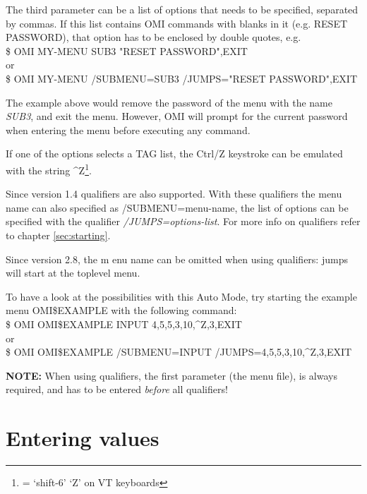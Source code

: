 \documentclass[a4paper]{book}
\newcommand{\vs}{\vspace{3mm}}
\renewcommand{\indent}{\hspace*{5mm}}
\begin{document}
\vs

The third parameter can be a list of options that needs to be specified, 
separated by commas. If this list contains OMI commands with blanks in it 
(e.g. \textsf{RESET PASSWORD}), that option has to be enclosed by double quotes, e.g. \\
\indent\textsf{{\$} OMI MY-MENU SUB3 "RESET PASSWORD",EXIT} \\
or \\
\indent\textsf{{\$} OMI MY-MENU /SUBMENU=SUB3 /JUMPS="RESET PASSWORD",EXIT}

The example above would remove the password of the menu with the name \textsl{SUB3}, 
and exit the menu. However, OMI will prompt for the current password when 
entering the menu before executing any command.

\vs

If one of the options selects a TAG list, the Ctrl/Z{} keystroke can be 
emulated with the string \textsf{\^{}Z}\footnote{ = `shift-6' `Z' on VT keyboards}.

\vs

Since version 1.4 qualifiers are also supported. With these qualifiers the 
menu name can also specified as \textsf{/SUBMENU=menu-name}, the list of 
options can be specified with the qualifier \textsl{/JUMPS=options-list}. 
For more info on qualifiers refer to chapter \ref{sec:starting}.

Since version 2.8, the m enu name can be omitted when using qualifiers: jumps will
start at the toplevel menu.

To have a look at the possibilities with this Auto Mode, try starting the 
example menu OMI{\$}EXAMPLE with the following command:\\
\indent\textsf{{\$} OMI OMI{\$}EXAMPLE INPUT 4,5,5,3,10,\^{}Z,3,EXIT} \\
or \\
\indent\textsf{{\$} OMI OMI{\$}EXAMPLE /SUBMENU=INPUT /JUMPS=4,5,5,3,10,\^{}Z,3,EXIT}

\vs

\hspace{-8mm}\textbf{NOTE:} When using qualifiers, the first parameter (the menu file), 
is always required, and has to be entered \textit{before} all qualifiers!

\section{Entering values}
\label{subsec:entering}
\end{document}

